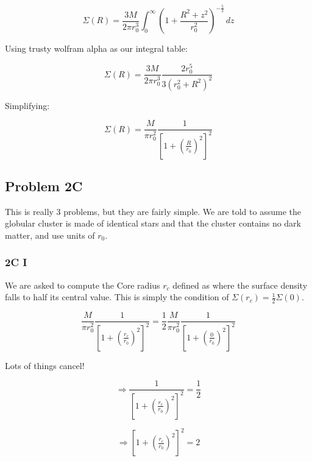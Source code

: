 \begin{equation}
\Sigma(R) = \frac{3 M }{2\pi r_0^3} 
\int_{0}^{\infty} \left( 1 + \frac{R^2 + z^2}{r_0^2} \right)^{-\tfrac{5}{2}} \, dz
\end{equation}

Using trusty wolfram alpha as our integral table:

\begin{equation}
\Sigma(R) = \frac{3 M }{2\pi r_0^3} \frac{2r_0^5}{3(r_0^2 + R^2)^2}
\end{equation}

Simplifying: 

\begin{equation}
\boxed{\Sigma(R) = \frac{M}{\pi r_0^2}\frac{1}{\left[1 + \left(\tfrac{R}{r_0}\right)^2\right]^2}}
\end{equation}

\subsection*{Problem 2C}
This is really 3 problems, but they are fairly simple. We are told to assume the globular cluster is made of identical stars and that the cluster contains no dark matter, and use units of $r_0$. 


\subsubsection*{2C I}

We are asked to compute the Core radius $r_c$ defined as where the surface density falls to half its central value. This is simply the condition of $\Sigma(r_c) = \frac{1}{2}\Sigma(0)$.

\begin{equation}
\frac{M}{\pi r_0^2}\frac{1}{\left[1 + \left(\tfrac{r_c}{r_0}\right)^2\right]^2} =  \frac{1}{2} \frac{M}{\pi r_0^2}\frac{1}{\left[1 + \left(\tfrac{0}{r_0}\right)^2\right]^2}
\end{equation}

Lots of things cancel!

\begin{equation}
\Rightarrow \frac{1}{\left[1 + \left(\tfrac{r_c}{r_0}\right)^2\right]^2} = \frac{1}{2}
\end{equation}

\begin{equation}
\Rightarrow \left[1 + \left(\tfrac{r_c}{r_0}\right)^2\right]^2 = 2
\end{equation}


